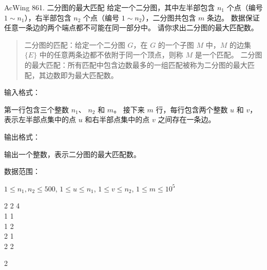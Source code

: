 \begin{titledbox}{AcWing 861. 二分图的最大匹配}
    给定一个二分图，其中左半部包含 $n_1$ 个点（编号 $1 \sim n_1$），右半部包含 $n_2$ 个点（编号 $1 \sim n_2$），二分图共包含 $m$ 条边。 数据保证任意一条边的两个端点都不可能在同一部分中。 请你求出二分图的最大匹配数。

    \begin{quote}
        二分图的匹配：给定一个二分图 $G$，在 $G$ 的一个子图 $M$ 中，$M$ 的边集 $\{E\}$ 中的任意两条边都不依附于同一个顶点，则称 $M$ 是一个匹配。
        二分图的最大匹配：所有匹配中包含边数最多的一组匹配被称为二分图的最大匹配，其边数即为最大匹配数。
    \end{quote}

    输入格式：

    第一行包含三个整数 $n_1$、 $n_2$ 和 $m$。 接下来 $m$ 行，每行包含两个整数 $u$ 和 $v$，表示左半部点集中的点 $u$ 和右半部点集中的点 $v$ 之间存在一条边。

    输出格式：

    输出一个整数，表示二分图的最大匹配数。

    数据范围：

    $1 \le n_1,n_2 \le 500$, $1 \le u \le n_1$, $1 \le v \le n_2$, $1 \le m \le 10^5$

    \begin{inputblock}
        2 2 4 \\
        1 1 \\
        1 2 \\
        2 1 \\
        2 2
    \end{inputblock}
    \begin{outputblock}
        2
    \end{outputblock}
\end{titledbox}
